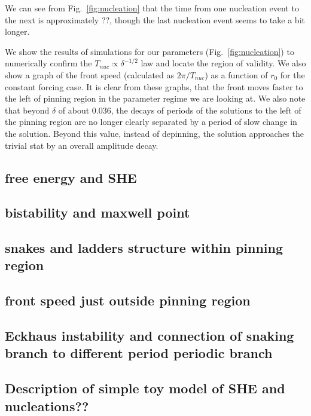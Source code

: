 \documentclass[../main/TimeForcingSHE.tex]{subfiles}
\begin{document}
We can see from Fig.~\ref{fig:nucleation} that the time from one nucleation event to the next is approximately ??, though the last nucleation event seems to take a bit longer.  %

\FIGnucleation

We show the results of simulations  for our parameters (Fig.~\ref{fig:nucleation}) to numerically confirm the $T_{nuc}\propto \delta^{-1/2}$ law  and locate the region of validity.  We also show a graph of the front speed (calculated as $2 \pi / T_{nuc}$) as a function of $r_0$ for the constant forcing case.   It is clear from these graphs, that the front moves faster to the left of pinning region in the parameter regime we are looking at.  We also note that beyond $\delta$ of about 0.036, the decays of periods of the solutions to the left of the pinning region are no longer clearly separated by a period of slow change in the solution.  Beyond this value, instead of depinning, the solution approaches the trivial stat by an overall amplitude decay.


\subsection{free energy and SHE}
\subsection{bistability and maxwell point}
\subsection{snakes and ladders structure within pinning region}
\subsection{front speed just outside pinning region}
\subsection{Eckhaus instability and connection of snaking branch to different period periodic branch}
\subsection{Description of simple toy model of SHE and nucleations??}
\end{document}
